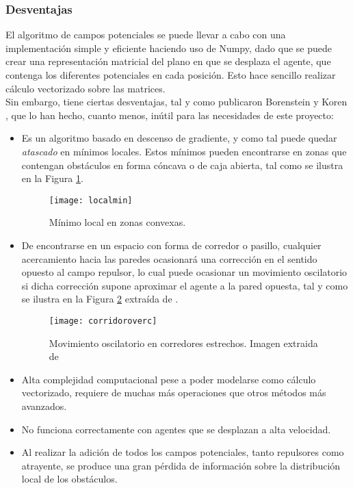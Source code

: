  \newpage
\subsubsection{Desventajas}
El algoritmo de campos potenciales se puede llevar a cabo con una implementación simple y eficiente haciendo uso de Numpy, dado que se puede crear una representación matricial del plano en que se desplaza el agente, que contenga los diferentes potenciales en cada posición. 
Esto hace sencillo realizar cálculo vectorizado sobre las matrices. \\Sin embargo, tiene ciertas desventajas, tal y como publicaron Borenstein y Koren \citep{art:BorensteinLims}, que lo han hecho, cuanto menos, inútil para las necesidades de este proyecto:
\begin{itemize}
\item Es un algoritmo basado en descenso de gradiente, y como tal puede quedar \textit{atascado} en mínimos locales. Estos mínimos pueden encontrarse en zonas que contengan obstáculos en forma cóncava o de caja abierta, tal como se ilustra en la Figura \ref{fig:localmin}.
\begin{figure}[H]
	\centering
	\texttt{[image: localmin]}
	\caption{Mínimo local en zonas convexas.}\label{fig:localmin}
\end{figure}
\item \label{subsec:PFlims} De encontrarse en un espacio con forma de corredor o pasillo, cualquier acercamiento hacia las paredes ocasionará una corrección en el sentido opuesto al campo repulsor, lo cual puede ocasionar un movimiento oscilatorio si dicha corrección supone aproximar el agente a la pared opuesta, tal y como se ilustra en la Figura \ref{fig:corridoroverc} extraída de \citep{art:BorensteinLims}.
\begin{figure}[H]
	\centering
	\texttt{[image: corridoroverc]}
	\caption[Movimiento oscilatorio en corredores estrechos.]{Movimiento oscilatorio en corredores estrechos. Imagen extraida de \citep{art:BorensteinKorenVFHHTML}}\label{fig:corridoroverc}
\end{figure}
\item Alta complejidad computacional pese a poder modelarse como cálculo vectorizado, requiere de muchas más operaciones que otros métodos más avanzados.
\item No funciona correctamente con agentes que se desplazan a alta velocidad. 
\item Al realizar la adición de todos los campos potenciales, tanto repulsores como atrayente, se produce una gran pérdida de información sobre la distribución local de los obstáculos.
\end{itemize} 

